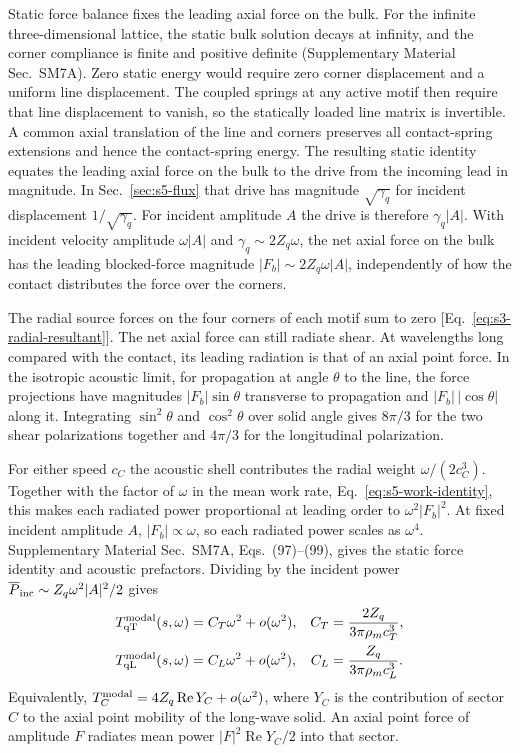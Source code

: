 \documentclass[10pt,aps,onecolumn,floatfix,notitlepage,nofootinbib,showkeys]{revtex4-2}
\newcommand{\qT}{\mathrm{qT}}
\newcommand{\qL}{\mathrm{qL}}
\begin{document}
Static force balance fixes the leading axial force on the bulk. For the infinite three-dimensional lattice, the static bulk solution decays at infinity, and the corner compliance is finite and positive definite (Supplementary Material Sec.~SM7A). Zero static energy would require zero corner displacement and a uniform line displacement. The coupled springs at any active motif then require that line displacement to vanish, so the statically loaded line matrix is invertible. A common axial translation of the line and corners preserves all contact-spring extensions and hence the contact-spring energy. The resulting static identity equates the leading axial force on the bulk to the drive from the incoming lead in magnitude. In Sec.~\ref{sec:s5-flux} that drive has magnitude $\sqrt{\gamma_q}$ for incident displacement $1/\sqrt{\gamma_q}$. For incident amplitude $A$ the drive is therefore $\gamma_q|A|$. With incident velocity amplitude $\omega|A|$ and $\gamma_q\sim2Z_q\omega$, the net axial force on the bulk has the leading blocked-force magnitude $|F_b|\sim2Z_q\omega|A|$, independently of how the contact distributes the force over the corners.

The radial source forces on the four corners of each motif sum to zero [Eq.~\eqref{eq:s3-radial-resultant}]. The net axial force can still radiate shear. At wavelengths long compared with the contact, its leading radiation is that of an axial point force. In the isotropic acoustic limit, for propagation at angle $\theta$ to the line, the force projections have magnitudes $|F_b|\sin\theta$ transverse to propagation and $|F_b|\,|\cos\theta|$ along it. Integrating $\sin^2\theta$ and $\cos^2\theta$ over solid angle gives $8\pi/3$ for the two shear polarizations together and $4\pi/3$ for the longitudinal polarization.

For either speed $c_C$ the acoustic shell contributes the radial weight $\omega/(2c_C^3)$. Together with the factor of $\omega$ in the mean work rate, Eq.~\eqref{eq:s5-work-identity}, this makes each radiated power proportional at leading order to $\omega^2|F_b|^2$. At fixed incident amplitude $A$, $|F_b|\propto\omega$, so each radiated power scales as $\omega^4$. Supplementary Material Sec.~SM7A, Eqs.~(97)--(99), gives the static force identity and acoustic prefactors. Dividing by the incident power $\overline P_{\rm inc}\sim Z_q\omega^2|A|^2/2$ gives
\begin{align}
 T_{\qT}^{\rm modal}(s,\omega)
 &=C_T\omega^2+o(\omega^2),
 & C_T&=\frac{2Z_q}{3\pi\rho_m c_T^3},\nonumber\\
 T_{\qL}^{\rm modal}(s,\omega)
 &=C_L\omega^2+o(\omega^2),
 & C_L&=\frac{Z_q}{3\pi\rho_m c_L^3}.
 \label{pred:eq-lowfreq}
\end{align}
Equivalently, $T_C^{\rm modal}=4Z_q\operatorname{Re}Y_C+o(\omega^2)$, where $Y_C$ is the contribution of sector $C$ to the axial point mobility of the long-wave solid. An axial point force of amplitude $F$ radiates mean power $|F|^2\operatorname{Re}Y_C/2$ into that sector.
\end{document}
